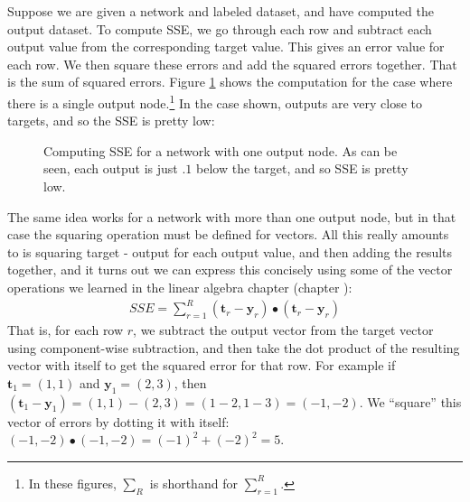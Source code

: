 Suppose we are given a network and labeled dataset, and have computed the output dataset. To compute SSE, we go through each row and subtract each output value from the corresponding target value. This gives an error value for each row. We then square these errors and add the squared errors together. That is the sum of squared errors. Figure \ref{error_computation1} shows the computation for the case where there is a single output node.\footnote{In these figures, $\sum_R$ is shorthand for $\sum_{r=1}^{R}$.}  In the case shown, outputs are very close to targets, and so the SSE is pretty low:

\begin{figure}[h]
\centering
{}
\caption[Jeff Yoshimi.]{Computing SSE for a network with one output node. As can be seen, each output is just $.1$ below the target, and so SSE is pretty low. }
\label{error_computation1}
\end{figure}

The same idea works  for a network with more than one output node, but in that case the squaring operation must be defined for vectors. All this really amounts to is squaring target - output for each output value, and then adding the results together, and it turns out we can express this concisely using some of the vector operations we learned in the linear algebra chapter (chapter ):
\begin{eqnarray*}
SSE =  \sum_{r=1}^{R}(\mathbf{t}_r - \mathbf{y}_r) \bullet (\mathbf{t}_r - \mathbf{y}_r)
\end{eqnarray*}
That is, for each row $r$, we subtract the output vector from the target vector using component-wise subtraction, and then take the dot product of the resulting vector with itself to get the squared error for that row. For example if $\mathbf{t}_1 = (1,1)$ and $\mathbf{y}_1 = (2,3)$, then  $(\mathbf{t}_1 - \mathbf{y}_1) = (1,1) - (2,3) = (1-2,1-3) = (-1,-2)$. We ``square'' this vector of errors by dotting it with itself: $(-1,-2) \bullet (-1,-2) = (-1)^2 + (-2)^2 = 5$.

